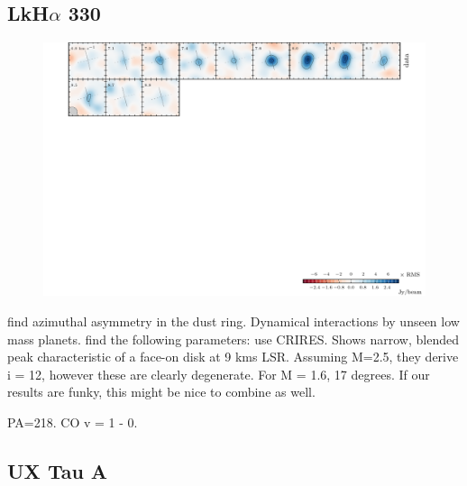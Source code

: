 \documentclass[twocolumn]{aastex6}
\begin{document}
\subsection{LkH$\alpha$ 330}
\begin{figure}[htb]
\begin{center}
  \includegraphics{LkHa330.pdf}
  \end{center}
\end{figure}

\citet{isella13} find azimuthal asymmetry in the dust ring. Dynamical interactions by unseen low mass planets.
\citep{andrews11a} find the following parameters:
\citep{pontoppidan11} use CRIRES. Shows narrow, blended peak characteristic of a face-on disk at 9 kms LSR. Assuming M=2.5, they derive i = 12, however these are clearly degenerate. For M = 1.6, 17 degrees. If our results are funky, this might be nice to combine as well.

PA=218. CO v = 1 - 0.



\subsection{UX Tau A}
\end{document}
